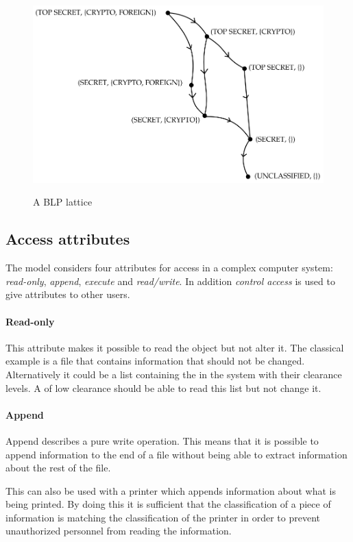 \begin{figure}
\centering
\includegraphics[width=\textwidth]{figures/blp_lattice}
\label{blp:lattice}
\caption{A BLP lattice \cite{anderson2008security}}
\end{figure}

\subsection{Access attributes}
The model considers four attributes for access in a complex computer system: \emph{read-only}, \emph{append}, \emph{execute} and \emph{read/write}.
In addition \emph{control access} is used to give attributes to other users.

\paragraph{Read-only}
This attribute makes it possible to read the object but not alter it.
The classical example is a file that contains information that should not be changed.
Alternatively it could be a list containing the \principals{} in the system with their clearance levels.
A \principal{} of low clearance should be able to read this list but not change it.

\paragraph{Append}
Append describes a pure write operation.
This means that it is possible to append information to the end of a file without being able to extract information about the rest of the file.

This can also be used with a printer which appends information about what is being printed.
By doing this it is sufficient that the classification of a piece of information is matching the classification of the printer in order to prevent unauthorized personnel from reading the information.

